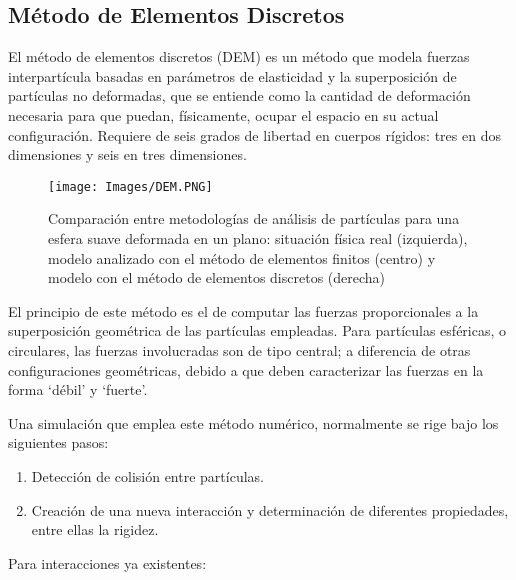 \begin{center}
	\section{M\'etodo de Elementos Discretos}
\end{center}

\noindent
\justify

El m\'etodo de elementos discretos (DEM) es un m\'etodo que modela fuerzas interpart\'icula basadas en par\'ametros de elasticidad y la superposici\'on de part\'iculas no deformadas, que se entiende como la cantidad de deformaci\'on necesaria para que puedan, f\'isicamente, ocupar el espacio en su actual configuraci\'on. Requiere de seis grados de libertad en cuerpos r\'igidos: tres en dos dimensiones y seis en tres dimensiones.

\begin{figure}[h!]
	\centering
	\texttt{[image: Images/DEM.PNG]}
	\label{dem}
	\caption{Comparaci\'on entre metodolog\'ias de an\'alisis de part\'iculas para una esfera suave deformada en un plano: situaci\'on f\'isica real (izquierda), modelo analizado con el m\'etodo de elementos finitos (centro) y modelo con el m\'etodo de elementos discretos (derecha)}
\end{figure}

\noindent
\justify

El principio de este m\'etodo es el de computar las fuerzas proporcionales a la superposici\'on geom\'etrica de las part\'iculas empleadas. Para part\'iculas esf\'ericas, o circulares, las fuerzas involucradas son de tipo central; a diferencia de otras configuraciones geom\'etricas, debido a que deben caracterizar las fuerzas en la forma `d\'ebil' y `fuerte'. 

\noindent
\justify

Una simulaci\'on que emplea este m\'etodo num\'erico, normalmente se rige bajo los siguientes pasos:

\begin{enumerate}
	\item Detecci\'on de colisi\'on entre part\'iculas.
	\item Creaci\'on de una nueva interacci\'on y determinaci\'on de diferentes propiedades, entre ellas la rigidez.
\end{enumerate}

\noindent
\justify

Para interacciones ya existentes:


